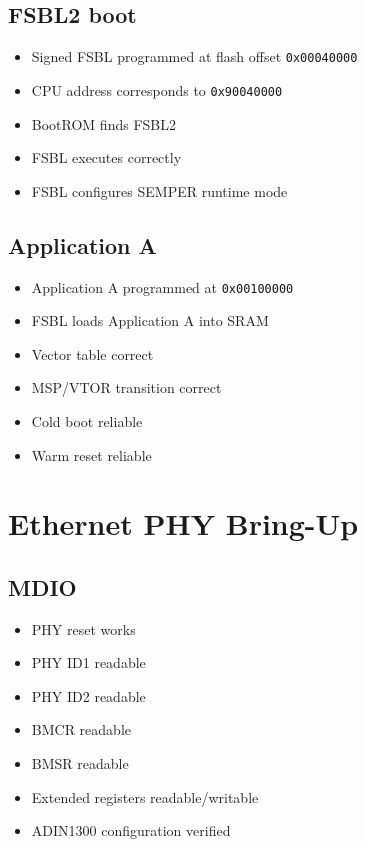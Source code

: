 \documentclass[10pt,a4paper,oneside]{report}
\providecommand{\tightlist}{\setlength{\itemsep}{1pt}\setlength{\parskip}{1pt}}
\begin{document}
\subsection{FSBL2 boot}\label{wiki-hardware-bring-up-and-testing--92-fsbl2-boot}

\begin{itemize}
\tightlist
\item[$\square$]
  Signed FSBL programmed at flash offset \texttt{0x00040000}
\item[$\square$]
  CPU address corresponds to \texttt{0x90040000}
\item[$\square$]
  BootROM finds FSBL2
\item[$\square$]
  FSBL executes correctly
\item[$\square$]
  FSBL configures SEMPER runtime mode
\end{itemize}

\subsection{Application A}\label{wiki-hardware-bring-up-and-testing--93-application-a}

\begin{itemize}
\tightlist
\item[$\square$]
  Application A programmed at \texttt{0x00100000}
\item[$\square$]
  FSBL loads Application A into SRAM
\item[$\square$]
  Vector table correct
\item[$\square$]
  MSP/VTOR transition correct
\item[$\square$]
  Cold boot reliable
\item[$\square$]
  Warm reset reliable
\end{itemize}

\section{Ethernet PHY Bring-Up}\label{wiki-hardware-bring-up-and-testing--10-ethernet-phy-bring-up}

\subsection{MDIO}\label{wiki-hardware-bring-up-and-testing--101-mdio}

\begin{itemize}
\tightlist
\item[$\square$]
  PHY reset works
\item[$\square$]
  PHY ID1 readable
\item[$\square$]
  PHY ID2 readable
\item[$\square$]
  BMCR readable
\item[$\square$]
  BMSR readable
\item[$\square$]
  Extended registers readable/writable
\item[$\square$]
  ADIN1300 configuration verified
\end{itemize}
\end{document}
